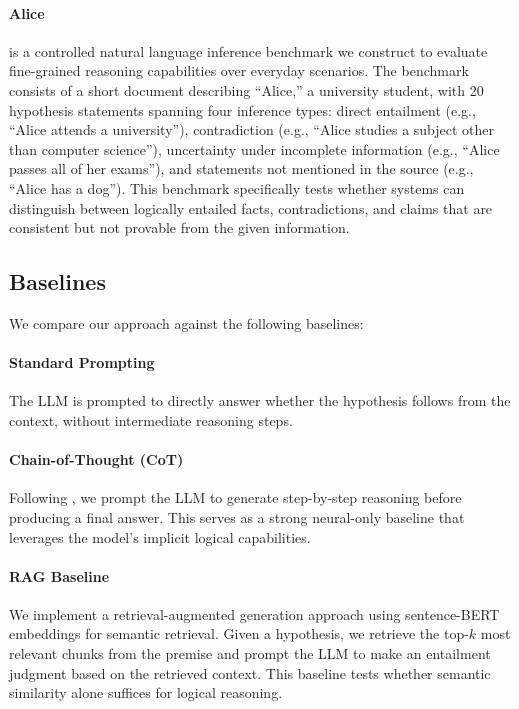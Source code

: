 \paragraph{Alice} is a controlled natural language inference benchmark we construct to evaluate fine-grained reasoning capabilities over everyday scenarios. The benchmark consists of a short document describing ``Alice,'' a university student, with 20 hypothesis statements spanning four inference types: direct entailment (e.g., ``Alice attends a university''), contradiction (e.g., ``Alice studies a subject other than computer science''), uncertainty under incomplete information (e.g., ``Alice passes all of her exams''), and statements not mentioned in the source (e.g., ``Alice has a dog''). This benchmark specifically tests whether systems can distinguish between logically entailed facts, contradictions, and claims that are consistent but not provable from the given information.

\subsection{Baselines}
\label{subsec:baselines}

We compare our approach against the following baselines:

\paragraph{Standard Prompting} The LLM is prompted to directly answer whether the hypothesis follows from the context, without intermediate reasoning steps.

\paragraph{Chain-of-Thought (CoT)} Following \citet{wei2022chain}, we prompt the LLM to generate step-by-step reasoning before producing a final answer. This serves as a strong neural-only baseline that leverages the model's implicit logical capabilities.

\paragraph{RAG Baseline} We implement a retrieval-augmented generation approach using sentence-BERT embeddings \citep{reimers2019sentence} for semantic retrieval. Given a hypothesis, we retrieve the top-$k$ most relevant chunks from the premise and prompt the LLM to make an entailment judgment based on the retrieved context. This baseline tests whether semantic similarity alone suffices for logical reasoning.

